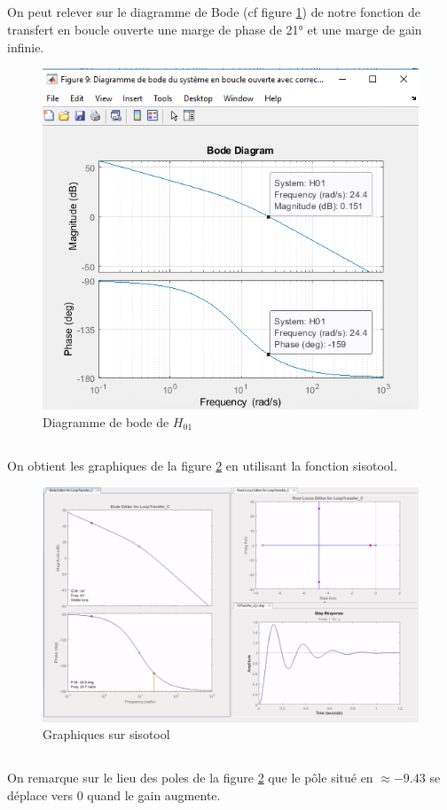 \documentclass{article}
\begin{document}
\subsection{}
On peut relever sur le diagramme de Bode (cf figure \ref{fig:bode137}) de notre fonction de transfert en boucle ouverte une marge de phase de 21° et une marge de gain infinie.
\begin{figure}[h]
    \centering
    \includegraphics[width=0.5\linewidth]{bode137.png}
    \caption{Diagramme de bode de $H_{01}$}
    \label{fig:bode137}
\end{figure}
\subsection{}
On obtient les graphiques de la figure \ref{fig:sisotool128} en utilisant la fonction sisotool.
\begin{figure}[h]
    \centering
    \includegraphics[width=1\linewidth]{sisotool138.png}
    \caption{Graphiques sur sisotool}
    \label{fig:sisotool128}
\end{figure}
\subsection{}
On remarque sur le lieu des poles de la figure \ref{fig:sisotool128} que le pôle situé en $\approx-9.43$ se déplace vers 0 quand le gain augmente.
\end{document}

